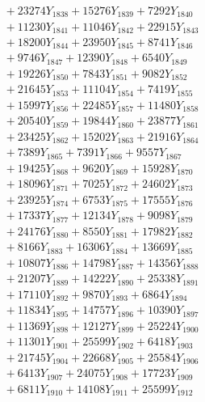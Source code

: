 \documentclass[a4paper,10pt]{article}
\begin{document}
{\begin{align}
&\;  + 23274 Y_{1838} + 15276 Y_{1839} + 7292 Y_{1840} \\[0.3ex]
&\;  + 11230 Y_{1841} + 11046 Y_{1842} + 22915 Y_{1843} \\[0.3ex]
&\;  + 18200 Y_{1844} + 23950 Y_{1845} + 8741 Y_{1846} \\[0.3ex]
&\;  + 9746 Y_{1847} + 12390 Y_{1848} + 6540 Y_{1849} \\[0.3ex]
&\;  + 19226 Y_{1850} + 7843 Y_{1851} + 9082 Y_{1852} \\[0.3ex]
&\;  + 21645 Y_{1853} + 11104 Y_{1854} + 7419 Y_{1855} \\[0.3ex]
&\;  + 15997 Y_{1856} + 22485 Y_{1857} + 11480 Y_{1858} \\[0.5ex]\allowbreak
&\;  + 20540 Y_{1859} + 19844 Y_{1860} + 23877 Y_{1861} \\[0.3ex]
&\;  + 23425 Y_{1862} + 15202 Y_{1863} + 21916 Y_{1864} \\[0.3ex]
&\;  + 7389 Y_{1865} + 7391 Y_{1866} + 9557 Y_{1867} \\[0.3ex]
&\;  + 19425 Y_{1868} + 9620 Y_{1869} + 15928 Y_{1870} \\[0.3ex]
&\;  + 18096 Y_{1871} + 7025 Y_{1872} + 24602 Y_{1873} \\[0.3ex]
&\;  + 23925 Y_{1874} + 6753 Y_{1875} + 17555 Y_{1876} \\[0.3ex]
&\;  + 17337 Y_{1877} + 12134 Y_{1878} + 9098 Y_{1879} \\[0.3ex]
&\;  + 24176 Y_{1880} + 8550 Y_{1881} + 17982 Y_{1882} \\[0.3ex]
&\;  + 8166 Y_{1883} + 16306 Y_{1884} + 13669 Y_{1885} \\[0.3ex]
&\;  + 10807 Y_{1886} + 14798 Y_{1887} + 14356 Y_{1888} \\[0.5ex]\allowbreak
&\;  + 21207 Y_{1889} + 14222 Y_{1890} + 25338 Y_{1891} \\[0.3ex]
&\;  + 17110 Y_{1892} + 9870 Y_{1893} + 6864 Y_{1894} \\[0.3ex]
&\;  + 11834 Y_{1895} + 14757 Y_{1896} + 10390 Y_{1897} \\[0.3ex]
&\;  + 11369 Y_{1898} + 12127 Y_{1899} + 25224 Y_{1900} \\[0.3ex]
&\;  + 11301 Y_{1901} + 25599 Y_{1902} + 6418 Y_{1903} \\[0.3ex]
&\;  + 21745 Y_{1904} + 22668 Y_{1905} + 25584 Y_{1906} \\[0.3ex]
&\;  + 6413 Y_{1907} + 24075 Y_{1908} + 17723 Y_{1909} \\[0.3ex]
&\;  + 6811 Y_{1910} + 14108 Y_{1911} + 25599 Y_{1912} \\[0.3ex]

\end{align}}
\end{document}
